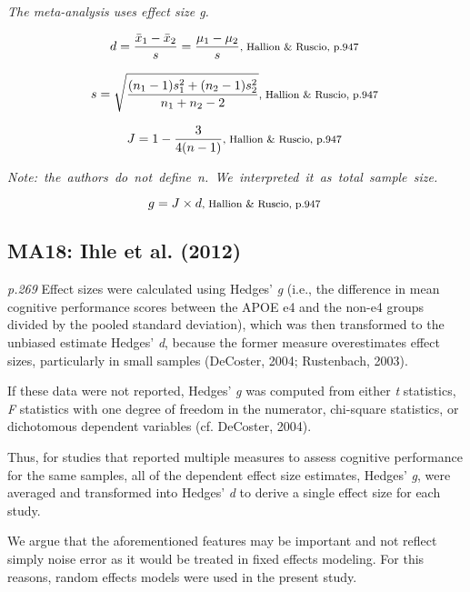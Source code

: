 \documentclass{article}
\begin{document}
\vspace{3mm}
\textit{The meta-analysis uses effect size g.}

\begin{equation*}
d={\frac {{\bar {x}}_{1}-{\bar {x}}_{2}}{s}}={\frac {\mu_{1}-\mu_{2}}{s}}  \mbox {\footnotesize,  Hallion \& Ruscio, p.947 } 
\end{equation*}

\begin{equation*}
s={\sqrt {\frac {(n_{1}-1)s_{1}^{2}+(n_{2}-1)s_{2}^{2}}{n_{1}+n_{2}-2}}} \mbox{\footnotesize, Hallion \& Ruscio, p.947 } 
\end{equation*}

\begin{equation*}
J={1-{\frac {3}{4(n-1)}}} \mbox {\footnotesize,  Hallion \& Ruscio, p.947 }
\end{equation*} 

\mbox {\footnotesize \textit{Note: the authors do not define n. We interpreted it as total sample size.}}

\begin{equation*}
g=J \times d \mbox{\footnotesize,  Hallion \& Ruscio, p.947 } 
\end{equation*}


\subsection*{MA18: Ihle et al. (2012)}

\textit{p.269} Effect sizes were calculated using Hedges’ \textit{g} (i.e., the difference in mean cognitive performance scores between the APOE e4 and the non-e4 groups divided by the pooled standard deviation), which was then transformed to the unbiased estimate Hedges’ \textit{d}, because the former measure overestimates effect sizes, particularly in small samples (DeCoster, 2004; Rustenbach, 2003).

If these data were not reported, Hedges’ \textit{g} was computed from either \textit{t} statistics, \textit{F} statistics with one degree of freedom in the numerator, chi-square statistics, or dichotomous dependent variables (cf. DeCoster, 2004).

Thus, for studies that reported multiple measures to assess cognitive performance for the same samples, all of the dependent effect size estimates, Hedges’ \textit{g}, were averaged and transformed into Hedges’ \textit{d} to derive a single effect size for each study.

We argue that the aforementioned features may be important and not reflect simply noise error as it would be treated in fixed  effects modeling. For this reasons, random effects models were used in the present study.
\end{document}
